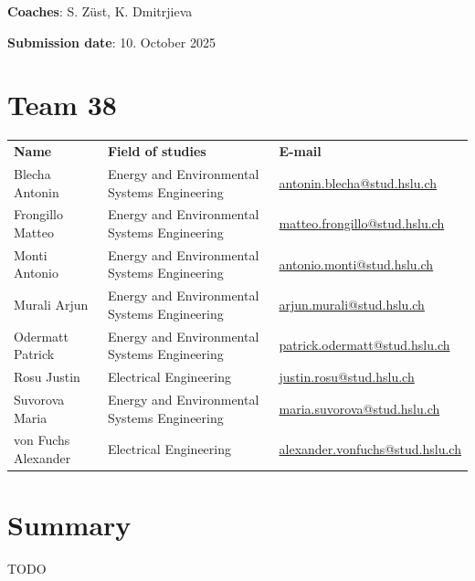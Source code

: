 \documentclass{article}
\begin{document}
\begin{titlepage}
    \large{\textbf{Coaches}: S. Züst, K. Dmitrjieva} 
    \vspace{.5cm}
    
    \large{\textbf{Submission date}: 10. October 2025}
\end{titlepage}

\newpage
\section*{Team 38}
\renewcommand{\arraystretch}{1.5}
\begin{tabular}{@{}p{}p{}p{}@{}}
\textbf{Name} & \textbf{Field of studies} & \textbf{E-mail} \\
Blecha Antonin & Energy and Environmental Systems Engineering & \href{mailto:antonin.blecha@stud.hslu.ch}{antonin.blecha@stud.hslu.ch} \\
Frongillo Matteo & Energy and Environmental Systems Engineering & \href{mailto:matteo.frongillo@stud.hslu.ch}{matteo.frongillo@stud.hslu.ch} \\
Monti Antonio & Energy and Environmental Systems Engineering & \href{mailto:antonio.monti@stud.hslu.ch}{antonio.monti@stud.hslu.ch} \\
Murali Arjun & Energy and Environmental Systems Engineering & \href{mailto:arjun.murali@stud.hslu.ch}{arjun.murali@stud.hslu.ch} \\
Odermatt Patrick & Energy and Environmental Systems Engineering & \href{mailto:patrick.odermatt@stud.hslu.ch}{patrick.odermatt@stud.hslu.ch} \\
Rosu Justin & Electrical Engineering & \href{mailto:justin.rosu@stud.hslu.ch}{justin.rosu@stud.hslu.ch} \\
Suvorova Maria & Energy and Environmental Systems Engineering & \href{mailto:maria.suvorova@stud.hslu.ch}{maria.suvorova@stud.hslu.ch} \\
von Fuchs Alexander & Electrical Engineering & \href{mailto:alexander.vonfuchs@stud.hslu.ch}{alexander.vonfuchs@stud.hslu.ch} \\
\end{tabular}

\vspace*{1cm}

\newpage
\section*{Summary}
TODO
\newpage
\end{document}
